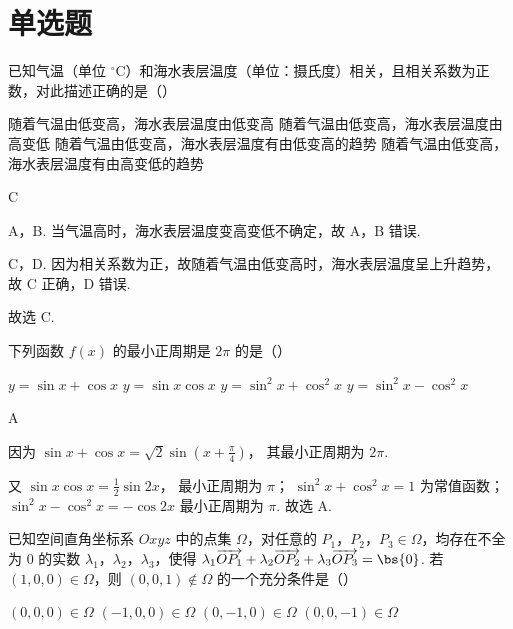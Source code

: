 \section{单选题}

\begin{problem}
已知气温（单位 \(^{\circ}\mathrm C\)）和海水表层温度（单位：摄氏度）相关，且相关系数为正数，对此描述正确的是（\quad）

\choices
    {随着气温由低变高，海水表层温度由低变高}
    {随着气温由低变高，海水表层温度由高变低}
    {随着气温由低变高，海水表层温度有由低变高的趋势}
    {随着气温由低变高，海水表层温度有由高变低的趋势}
\end{problem}

\begin{answer}
C
\end{answer}

\begin{solution}
A，B. 当气温高时，海水表层温度变高变低不确定，故 A，B 错误.

C，D. 因为相关系数为正，故随着气温由低变高时，海水表层温度呈上升趋势，故 C 正确，D 错误.

故选 C.
\end{solution}

\begin{problem}
下列函数 \(f(x)\) 的最小正周期是 \(2\pi\) 的是（\quad）

\choices
    {\(y=\sin x+\cos x\)}
    {\(y=\sin x\cos x\)}
    {\(y=\sin^2 x+\cos^2 x\)}
    {\(y=\sin^2 x-\cos^2 x\)}
\end{problem}

\begin{answer}
A
\end{answer}

\begin{solution}
因为
\(\sin x+\cos x=\sqrt{2}\sin\left( x+\frac{\pi}{4} \right)\)，
其最小正周期为 \(2\pi\).

又
\(\sin x\cos x=\frac{1}{2}\sin 2x\)，
最小正周期为 \(\pi\)；
\(\sin^2 x+\cos^2 x=1\)
为常值函数；
\(\sin^2 x-\cos^2 x=-\cos 2x\)
最小正周期为 \(\pi\). 故选 A.
\end{solution}

\begin{problem}
已知空间直角坐标系 \(Oxyz\) 中的点集 \(\Omega\)，对任意的 \(P_1\)，\(P_2\)，\(P_3\in \Omega\)，均存在不全为 \(0\) 的实数 \(\lambda_1\)，\(\lambda_2\)，\(\lambda_3\)，使得 \(\lambda_1\overrightarrow{OP_1}+\lambda_2\overrightarrow{OP_2}+\lambda_3\overrightarrow{OP_3}=\bs{0}\). 若 \((1,0,0)\in \Omega\)，则 \((0,0,1)\notin \Omega\) 的一个充分条件是（\quad）

\choices
    {\((0,0,0)\in \Omega\)}
    {\((-1,0,0)\in \Omega\)}
    {\((0,-1,0)\in \Omega\)}
    {\((0,0,-1)\in \Omega\)}
\end{problem}

